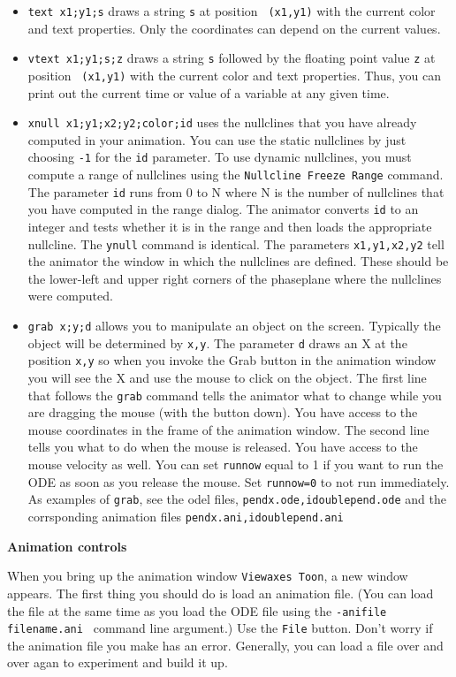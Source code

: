 \documentclass{article}
\begin{document}
\begin{itemize}
\item {\tt text x1;y1;s} draws a string {\tt s} at position {\tt
(x1,y1)} with the current color and text properties. Only the
coordinates can depend on the current values. 

\item {\tt vtext x1;y1;s;z} draws a string {\tt s} followed by
the floating point value {\tt z} at position {\tt
(x1,y1)} with the current color and text properties. Thus, you can
print out the current time or value of a variable at any given time.

\item{\tt xnull x1;y1;x2;y2;color;id} uses the nullclines that you
have already computed in your animation.  You can use the static
nullclines by just choosing {\tt -1} for the {\tt id} parameter.  To
use dynamic nullclines, you must compute a range of nullclines using
the {\tt Nullcline Freeze Range} command.  The parameter {\tt id} runs from
0 to N where N is the number of nullclines that you have computed in
the range dialog.  The animator converts {\tt id} to an integer and
tests whether it is in the range and then loads the appropriate
nullcline. The {\tt ynull} command is
identical. The parameters {\tt x1,y1,x2,y2} tell the animator the
window in which the nullclines are defined.  These should be the
lower-left and upper right corners of the phaseplane where the
nullclines were computed.
\item {\tt grab x;y;d} allows you to manipulate an object on the screen. Typically the object will be determined by {\tt x,y}. The parameter {\tt d} draws an X at the position {\tt x,y} so when you invoke the Grab button in the animation window you will see the X and use the mouse to click on the object. The first line that follows the {\tt grab} command tells the animator what to change while you are dragging the mouse (with the button down).  You have access to the mouse coordinates in the frame of the animation window. The second line tells you what to do when the mouse is released. You have access to the mouse velocity as well. You can set {\tt runnow} equal to 1 if you want to run the ODE as soon as you release the mouse. Set {\tt runnow=0} to not run immediately. As examples of {\tt grab}, see the odel files, {\tt pendx.ode,idoublepend.ode} and the corrsponding animation files {\tt pendx.ani,idoublepend.ani}
\end{itemize}

\bigskip
{\Large \bf Animation controls}

\noindent When you bring up the animation window {\tt Viewaxes Toon}, a new window appears. The first thing you should do is load an animation file. (You can load the file at the same time as you load the ODE file using the {\tt -anifile filename.ani } command line argument.) Use the {\tt File} button. Don't worry if the animation file you make has an error. Generally, you can load a file over and over agan to experiment and build it up.
\end{document}
